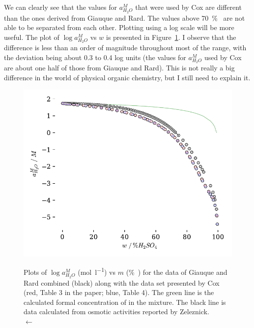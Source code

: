 \documentclass[]{tufte-handout}
\begin{document}
We can clearly see that the values for $a_{H_2O}^M$ that were used by Cox are different than the ones derived from Giauque and Rard. The values above \qty{70}{\percent{}} are not able to be separated from each other. Plotting using a log scale will be more useful. The plot of $\log{a_{H_2O}^M}$ vs $w$ is presented in Figure~\ref{fig:plot_H2}. I observe that the difference is less than an order of magnitude throughout most of the range, with the deviation being about 0.3 to 0.4 log units (the values for $a_{H_2O}^M$ used by Cox are about one half of those from Giauque and Rard). This is not really a big difference in the world of physical organic chemistry, but I still need to explain it.

\begin{figure}
  \centering
  \caption{Plots of $\log{a_{H_2O}^M}$ (\unit{\mole\per\litre}) vs $m$ (\unit{\percent{}}) for the data of Giauque and Rard combined (black) along with the data set presented by Cox (red, Table 3 in the paper; blue, Table 4). The green line is the calculated formal concentration of  in the mixture. The black line is data calculated from osmotic activities reported by Zeleznick.\\ $\longleftarrow$} 
 \includegraphics[scale=0.75]{images/plot_H3} 
  \label{fig:plot_H2}
\end{figure}
\end{document}

